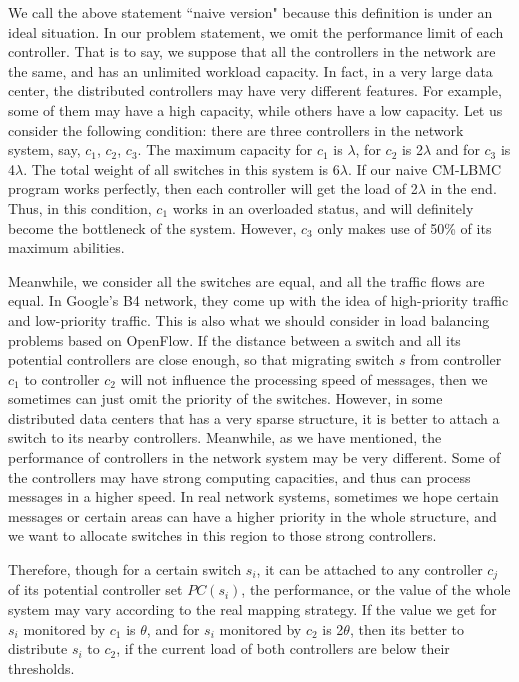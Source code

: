 We call the above statement ``naive version" because this definition is under an ideal situation. In our problem statement, we omit the performance limit of each controller. That is to say, we suppose that all the controllers in the network are the same, and has an unlimited workload capacity. In fact, in a very large data center, the distributed controllers may have very different features. For example, some of them may have a high capacity, while others have a low capacity. Let us consider the following condition: there are three controllers in the network system, say, $c_1$, $c_2$, $c_3$. The maximum capacity for $c_1$ is $\lambda$, for $c_2$ is 2$\lambda$ and for $c_3$ is 4$\lambda$. The total weight of all switches in this system is 6$\lambda$. If our naive CM-LBMC program works perfectly, then each controller will get the load of 2$\lambda$ in the end. Thus, in this condition, $c_1$ works in an overloaded status, and will definitely become the bottleneck of the system. However, $c_3$ only makes use of 50\% of its maximum abilities.

Meanwhile, we consider all the switches are equal, and all the traffic flows are equal. In Google's B4 network, they come up with the idea of high-priority traffic and low-priority traffic. This is also what we should consider in load balancing problems based on OpenFlow. If the distance between a switch and all its potential controllers are close enough, so that migrating switch $s$ from controller $c_1$ to controller $c_2$ will not influence the processing speed of messages, then we sometimes can just omit the priority of the switches. However, in some distributed data centers that has a very sparse structure, it is better to attach a switch to its nearby controllers. Meanwhile, as we have mentioned, the performance of controllers in the network system may be very different. Some of the controllers may have strong computing capacities, and thus can process messages in a higher speed. In real network systems, sometimes we hope certain messages or certain areas can have a higher priority in the whole structure, and we want to allocate switches in this region to those strong controllers.

Therefore, though for a certain switch $s_i$, it can be attached to any controller $c_j$ of its potential controller set $PC(s_i)$, the performance, or the value of the whole system may vary according to the real mapping strategy. If the value we get for $s_i$ monitored by $c_1$ is $\theta$, and for $s_i$ monitored by $c_2$ is 2$\theta$, then its better to distribute $s_i$ to $c_2$, if the current load of both controllers are below their thresholds.


